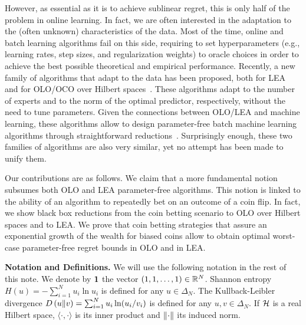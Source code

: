 However, as essential as it is to achieve sublinear regret, this is only half
of the problem in online learning. In fact, we are often interested in the
adaptation to the (often unknown) characteristics of the data. Most of the
time, online and batch learning algorithms fail on this side, requiring to set
hyperparameters (e.g., learning rates, step sizes, and regularization weights)
to oracle choices in order to achieve the best possible theoretical and
empirical performance. Recently, a new family of algorithms that adapt to the
data has been proposed, both for \ac{LEA}~\citep{Chaudhuri-Freund-Hsu-2009,
Chernov-Vovk-2010, Luo-Schapire-2014, Luo-Schapire-2015, Koolen-van-Erven-2015}
and for \ac{OLO}/\ac{OCO} over Hilbert spaces~\citep{Streeter-McMahan-2012,
Orabona-2013, McMahan-Abernethy-2013, McMahan-Orabona-2014, Orabona-2014}.
These algorithms adapt to the number of experts and to the norm of the optimal
predictor, respectively, without the need to tune parameters. Given the
connections between \ac{OLO}/\ac{LEA} and machine learning, these algorithms
allow to design parameter-free batch machine learning algorithms through
straightforward reductions~\citep{Orabona-2014,Luo-Schapire-2015}.
Surprisingly enough, these two families of algorithms are also very similar,
yet no attempt has been made to unify them.

Our contributions are as follows. We claim that a more fundamental notion
subsumes both \ac{OLO} and \ac{LEA} parameter-free algorithms. This notion is
linked to the ability of an algorithm to repeatedly bet on an outcome of a coin
flip. In fact, we show black
box reductions from the coin betting scenario to \ac{OLO} over Hilbert spaces
and to \ac{LEA}.  We prove that coin betting strategies
that assure an exponential growth of the wealth for biased coins allow to
obtain optimal worst-case parameter-free regret bounds in \ac{OLO} and in
\ac{LEA}.

\noindent\textbf{Notation and Definitions.} We will use the following notation
in the rest of this note. We denote by $\mathbf{1}$ the vector $(1,1,\dots,1)
\in \mathbb{R}^N$. Shannon entropy $H(u) = -\sum_{i=1}^N u_i \ln u_i$ is defined for
any $u \in \Delta_N$.  The Kullback-Leibler divergence $D\left({u}\middle\|{v}\right) =
\sum_{i=1}^N u_i \ln(u_i/v_i)$ is defined for any $u,v \in \Delta_N$. If $\mathcal{H}$
is a real Hilbert space, $\langle \cdot, \cdot \rangle$ is its inner
product and $\left\|{\cdot}\right\|$ its induced norm.
